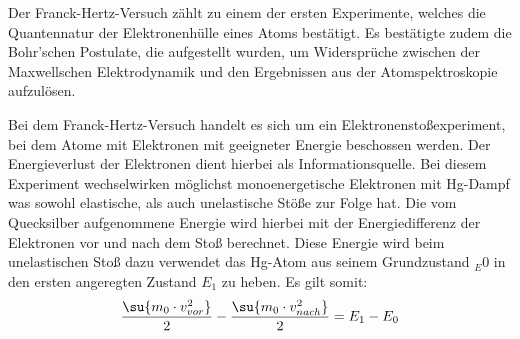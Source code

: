 Der Franck-Hertz-Versuch zählt zu einem der ersten Experimente, welches die
Quantennatur der Elektronenhülle eines Atoms bestätigt. Es bestätigte zudem die
Bohr'schen Postulate, die aufgestellt wurden, um Widersprüche zwischen der
Maxwellschen Elektrodynamik und den Ergebnissen aus der Atomspektroskopie
aufzulösen.

Bei dem Franck-Hertz-Versuch handelt es sich um ein Elektronenstoßexperiment,
bei dem Atome mit Elektronen mit geeigneter Energie beschossen werden. Der
Energieverlust der Elektronen dient hierbei als Informationsquelle. Bei diesem
Experiment wechselwirken möglichst monoenergetische Elektronen mit Hg-Dampf
was sowohl elastische, als auch unelastische Stöße zur Folge hat. Die vom
Quecksilber aufgenommene Energie wird hierbei mit der Energiedifferenz der
Elektronen vor und nach dem Stoß berechnet. Diese Energie wird beim unelastischen
Stoß dazu verwendet das Hg-Atom aus seinem Grundzustand $_E0$ in den ersten angeregten
Zustand $E_1$ zu heben. Es gilt somit:
\begin{equation}
  \frac{\su{m_0\cdot v_{vor}^2}}{2}-\frac{\su{m_0\cdot v_{nach}^2}}{2} = E_1-E_0
\end{equation}

